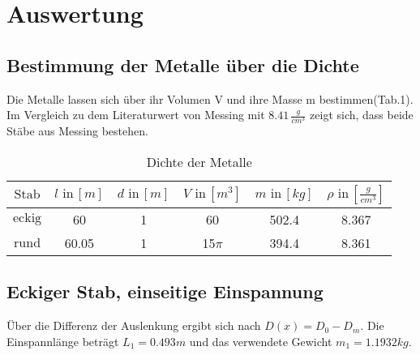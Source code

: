 \section{Auswertung}
\label{sec:Auswertung}



\subsection{Bestimmung der Metalle über die Dichte}
Die Metalle lassen sich über ihr Volumen V und ihre Masse m bestimmen(Tab.1).
Im Vergleich zu dem Literaturwert von Messing mit $8.41\, \frac{g}{cm^3}$\cite{litval}
zeigt sich, dass beide Stäbe aus Messing bestehen.
\begin{table}[h]
  \centering
  \label{tab:lit}
  \begin{tabular}{ c c c c c c }
    \toprule
    {$\text{Stab}$}
   &{$l \,\, \text{in} \, [m]$}
   &{$d \,\, \text{in} \, [m]$}
   &{$V \,\, \text{in} \, [m^3]$}
   &{$m \,\, \text{in} \, [kg]$}
   &{$\rho \,\, \text{in} \, [\frac{g}{cm^3}]$} \\
    \midrule
     {$\text{eckig}$}&60&1&60&502.4 & 8.367 \\
     {$\text{rund}$}&60.05&1&15$\pi$&394.4 & 8.361 \\
    \bottomrule
  \end{tabular}
  \caption{Dichte der Metalle}
\end{table}


\subsection{Eckiger Stab, einseitige Einspannung}

Über die Differenz der Auslenkung  ergibt sich nach
$D(x) = D_0 - D_m$. Die Einspannlänge beträgt $L_1 = 0.493m$ und
das verwendete Gewicht $m_1 = 1.1932 kg$.

